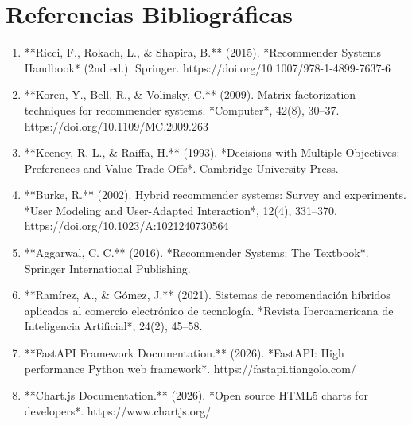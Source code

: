 \chapter{Referencias Bibliográficas}

\begin{enumerate}
    \item **Ricci, F., Rokach, L., \& Shapira, B.** (2015). *Recommender Systems Handbook* (2nd ed.). Springer. https://doi.org/10.1007/978-1-4899-7637-6
    \item **Koren, Y., Bell, R., \& Volinsky, C.** (2009). Matrix factorization techniques for recommender systems. *Computer*, 42(8), 30--37. https://doi.org/10.1109/MC.2009.263
    \item **Keeney, R. L., \& Raiffa, H.** (1993). *Decisions with Multiple Objectives: Preferences and Value Trade-Offs*. Cambridge University Press.
    \item **Burke, R.** (2002). Hybrid recommender systems: Survey and experiments. *User Modeling and User-Adapted Interaction*, 12(4), 331--370. https://doi.org/10.1023/A:1021240730564
    \item **Aggarwal, C. C.** (2016). *Recommender Systems: The Textbook*. Springer International Publishing.
    \item **Ramírez, A., \& Gómez, J.** (2021). Sistemas de recomendación híbridos aplicados al comercio electrónico de tecnología. *Revista Iberoamericana de Inteligencia Artificial*, 24(2), 45--58.
    \item **FastAPI Framework Documentation.** (2026). *FastAPI: High performance Python web framework*. https://fastapi.tiangolo.com/
    \item **Chart.js Documentation.** (2026). *Open source HTML5 charts for developers*. https://www.chartjs.org/
\end{enumerate}
